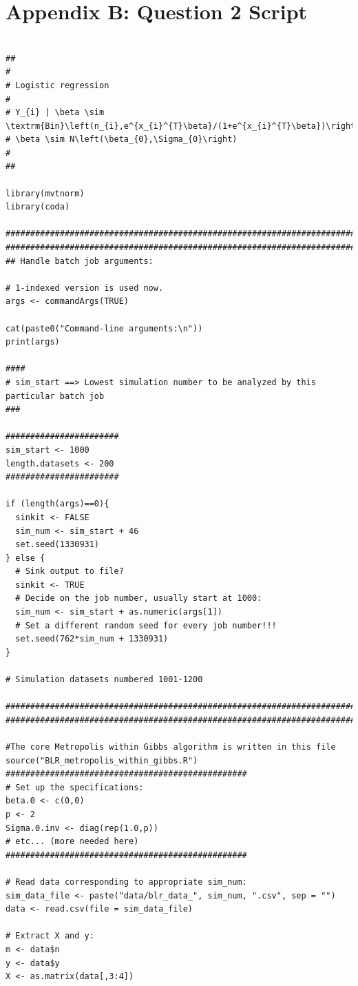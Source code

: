 \documentclass[11pt]{amsart}
\begin{document}
\section*{Appendix B: Question 2 Script}
\begin{verbatim}

##
#
# Logistic regression
# 
# Y_{i} | \beta \sim \textrm{Bin}\left(n_{i},e^{x_{i}^{T}\beta}/(1+e^{x_{i}^{T}\beta})\right)
# \beta \sim N\left(\beta_{0},\Sigma_{0}\right)
#
##

library(mvtnorm)
library(coda)

########################################################################################
########################################################################################
## Handle batch job arguments:

# 1-indexed version is used now.
args <- commandArgs(TRUE)

cat(paste0("Command-line arguments:\n"))
print(args)

####
# sim_start ==> Lowest simulation number to be analyzed by this particular batch job
###

#######################
sim_start <- 1000
length.datasets <- 200
#######################

if (length(args)==0){
  sinkit <- FALSE
  sim_num <- sim_start + 46
  set.seed(1330931)
} else {
  # Sink output to file?
  sinkit <- TRUE
  # Decide on the job number, usually start at 1000:
  sim_num <- sim_start + as.numeric(args[1])
  # Set a different random seed for every job number!!!
  set.seed(762*sim_num + 1330931)
}

# Simulation datasets numbered 1001-1200

########################################################################################
########################################################################################

#The core Metropolis within Gibbs algorithm is written in this file
source("BLR_metropolis_within_gibbs.R")
#################################################
# Set up the specifications:
beta.0 <- c(0,0)
p <- 2
Sigma.0.inv <- diag(rep(1.0,p))
# etc... (more needed here)
#################################################

# Read data corresponding to appropriate sim_num:
sim_data_file <- paste("data/blr_data_", sim_num, ".csv", sep = "")
data <- read.csv(file = sim_data_file)

# Extract X and y:
m <- data$n
y <- data$y
X <- as.matrix(data[,3:4])


\end{verbatim}
\end{document}
